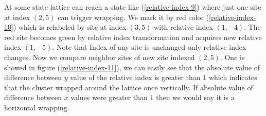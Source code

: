 \documentclass[10pt,a4paper]{report}
\begin{document}
 At some state lattice can reach a state like (\ref{relative-index-9}) where just one site at index $(2,5)$ can trigger wrapping. We mark it by red color (\ref{relative-index-10}) which is relabeled by site at index $(3,5)$ with relative index $(1,-4)$. The red site becomes green by relative index transformation and acquires new relative index $(1,-5)$. Note that Index of any site is unchanged only relative index changes. Now we compare neighbor sites of new site indexed $(2,5)$. One is showed in figure (\ref{relative-index-11}), we can easily see that the absolute value of difference between $y$ value of the relative index is greater than $1$ which indicates that the cluster wrapped around the lattice once vertically. If absolute value of difference between $x$ values were greater than $1$ then we would say it is a horizontal wrapping.
\begin{figure}
	\centering
	\caption{}
	\label{fig:relative-index-4}
\end{figure}
\end{document}
